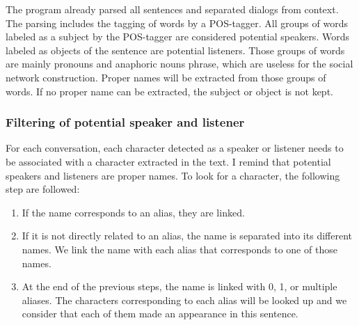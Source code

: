 \documentclass[a4paper, 12pt]{report}
\begin{document}
The program already parsed all sentences and separated dialogs from context. The parsing includes the tagging of words by a POS-tagger.
All groups of words labeled as a subject by the POS-tagger are considered potential speakers. Words labeled as objects of the sentence are potential listeners.
Those groups of words are mainly pronouns and anaphoric nouns phrase, which are useless for the social network construction.
Proper names will be extracted from those groups of words. If no proper name can be extracted, the subject or object is not kept.

\subsubsection{Filtering of potential speaker and listener}
\label{filtering}
For each conversation, each character detected as a speaker or listener needs to be associated with a character extracted in the text.
I remind that potential speakers and listeners are proper names. To look for a character, the following step are followed:\\
\begin{enumerate}
\item If the name corresponds to an alias, they are linked.
\item If it is not directly related to an alias, the name is separated into its different names. We link the name with each alias that corresponds to one of those names.
\item At the end of the previous steps, the name is linked with 0, 1, or multiple aliases. The characters corresponding to each alias will be looked up
and we consider that each of them made an appearance in this sentence.
\end{enumerate}
\end{document}
